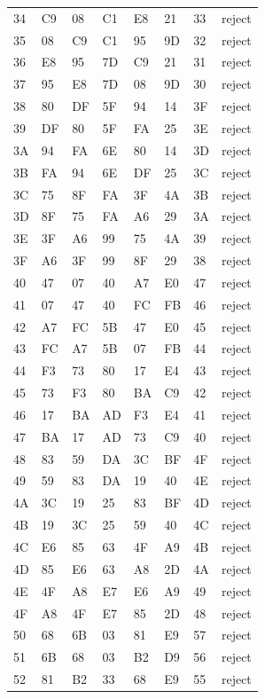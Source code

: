 \begin{longtable}{llllllll}
34 & C9 & 08 & C1 & E8 & 21 & 33 & reject\\
35 & 08 & C9 & C1 & 95 & 9D & 32 & reject\\
36 & E8 & 95 & 7D & C9 & 21 & 31 & reject\\
37 & 95 & E8 & 7D & 08 & 9D & 30 & reject\\
38 & 80 & DF & 5F & 94 & 14 & 3F & reject\\
39 & DF & 80 & 5F & FA & 25 & 3E & reject\\
3A & 94 & FA & 6E & 80 & 14 & 3D & reject\\
3B & FA & 94 & 6E & DF & 25 & 3C & reject\\
3C & 75 & 8F & FA & 3F & 4A & 3B & reject\\
3D & 8F & 75 & FA & A6 & 29 & 3A & reject\\
3E & 3F & A6 & 99 & 75 & 4A & 39 & reject\\
3F & A6 & 3F & 99 & 8F & 29 & 38 & reject\\
40 & 47 & 07 & 40 & A7 & E0 & 47 & reject\\
41 & 07 & 47 & 40 & FC & FB & 46 & reject\\
42 & A7 & FC & 5B & 47 & E0 & 45 & reject\\
43 & FC & A7 & 5B & 07 & FB & 44 & reject\\
44 & F3 & 73 & 80 & 17 & E4 & 43 & reject\\
45 & 73 & F3 & 80 & BA & C9 & 42 & reject\\
46 & 17 & BA & AD & F3 & E4 & 41 & reject\\
47 & BA & 17 & AD & 73 & C9 & 40 & reject\\
48 & 83 & 59 & DA & 3C & BF & 4F & reject\\
49 & 59 & 83 & DA & 19 & 40 & 4E & reject\\
4A & 3C & 19 & 25 & 83 & BF & 4D & reject\\
4B & 19 & 3C & 25 & 59 & 40 & 4C & reject\\
4C & E6 & 85 & 63 & 4F & A9 & 4B & reject\\
4D & 85 & E6 & 63 & A8 & 2D & 4A & reject\\
4E & 4F & A8 & E7 & E6 & A9 & 49 & reject\\
4F & A8 & 4F & E7 & 85 & 2D & 48 & reject\\
50 & 68 & 6B & 03 & 81 & E9 & 57 & reject\\
51 & 6B & 68 & 03 & B2 & D9 & 56 & reject\\
52 & 81 & B2 & 33 & 68 & E9 & 55 & reject\\

\end{longtable}
